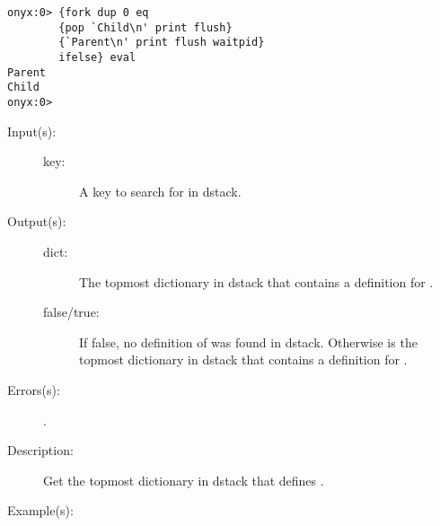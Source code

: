 \begin{description}
\begin{description}
\begin{verbatim}
onyx:0> {fork dup 0 eq
        {pop `Child\n' print flush}
        {`Parent\n' print flush waitpid}
        ifelse} eval
Parent
Child
onyx:0>
		\end{verbatim}
	\end{description}
\label{systemdict:where}
\item[{\onyxop{key}{where}{false}}: ]
\item[{\onyxop{key}{where}{dict true}}: ]
	\begin{description}\item[]
	\item[Input(s): ]
		\begin{description}\item[]
		\item[key: ]
			A key to search for in dstack.
		\end{description}
	\item[Output(s): ]
		\begin{description}\item[]
		\item[dict: ]
			The topmost dictionary in dstack that contains a
			definition for .
		\item[false/true: ]
			If false, no definition of  was found in
			dstack.  Otherwise  is the topmost
			dictionary in dstack that contains a definition for
			.
		\end{description}
	\item[Errors(s): ]
		\begin{description}\item[]
		\item[.]
		\end{description}
	\item[Description: ]
		Get the topmost dictionary in dstack that defines .
	\item[Example(s): ]\begin{verbatim}


\end{verbatim}
\end{description}
\end{description}
